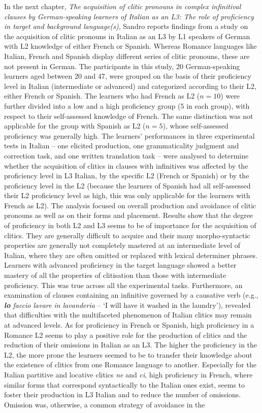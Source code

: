 \documentclass[output=paper,colorlinks,citecolor=brown,nonflat]{langsci/langscibook}
\begin{document}
In the next chapter, \textit{The acquisition of clitic pronouns in complex infinitival clauses by German-speaking learners of Italian as an L3: The role of proficiency in target and background language(s)}, Sandro \citeauthor{chapters/sciutti} reports findings from a study on the acquisition of clitic pronouns in Italian as an L3 by L1 speakers of German with L2 knowledge of either French or Spanish. Whereas Romance languages like Italian, French and Spanish display different series of clitic pronouns, these are not present in German. The participants in this study, 20 German-speaking learners aged between 20 and 47, were grouped on the basis of their proficiency level in Italian (intermediate or advanced) and categorized according to their L2, either French or Spanish. The learners who had French as L2 ($n=10$) were further divided into a low and a high proficiency group (5 in each group), with respect to their self-assessed knowledge of French. The same distinction was not applicable for the group with Spanish as L2 ($n=5$), whose self-assessed proficiency was generally high. The learners’ performances in three experimental tests in Italian – one elicited production, one grammaticality judgment and correction task, and one written translation task – were analysed to determine whether the acquisition of clitics in clauses with infinitives was affected by the proficiency level in L3 Italian, by the specific L2 (French or Spanish) or by the proficiency level in the L2 (because the learners of Spanish had all self-assessed their L2 proficiency level as high, this was only applicable for the learners with French as L2). The analysis focused on overall production and avoidance of clitic pronouns as well as on their forms and placement. Results show that the degree of proficiency in both L2 and L3 seems to be of importance for the acquisition of clitics. They are generally difficult to acquire and their many morpho-syntactic properties are generally not completely mastered at an intermediate level of Italian, where they are often omitted or replaced with lexical determiner phrases. Learners with advanced proficiency in the target language showed a better mastery of all the properties of clitisation than those with intermediate proficiency. This was true across all the experimental tasks. Furthermore, an examination of clauses containing an infinitive governed by a causative verb (e.g., \textit{\textbf{lo} faccio lavare in lavanderia} – ‘I will have it washed in the laundry’), revealed that difficulties with the multifaceted phenomenon of Italian clitics may remain at advanced levels. As for proficiency in French or Spanish, high proficiency in a Romance L2 seems to play a positive role for the production of clitics and the reduction of their omissions in Italian as an L3. The higher the proficiency in the L2, the more prone the learners seemed to be to transfer their knowledge about the existence of clitics from one Romance language to another. Especially for the Italian partitive and locative clitics \textit{ne} and \textit{ci}, high proficiency in French, where similar forms that correspond syntactically to the Italian ones exist, seems to foster their production in L3 Italian and to reduce the number of omissions. Omission was, otherwise, a common strategy of avoidance in the 
\end{document}
